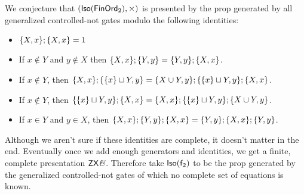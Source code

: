 \begin{conjecture}

We conjecture that $({\sf Iso}(\mathsf{FinOrd}_2),\times)$ is presented by the prop generated by all generalized controlled-not gates modulo the following identities:

\begin{itemize}
\item $\{ X,x\} ; \{ X,x \}= 1$ 


\item
If  $x \notin Y $ and $ y \notin X$ then $\{ X,x\} ;\{ Y,y\} =\{ Y,y\}; \{ X,x\} $.


%

\item
If $x \notin Y$, then $\{ X,x\}; \{ \{x\} \sqcup Y, y\} = \{ X\cup Y,y\} ; \{ \{x\} \sqcup Y, y\};  \{ X,x\} $.

\item
If $x \notin Y$, then $ \{ \{x\} \sqcup Y, y\} ; \{ X,x\} = \{ X,x\};   \{ \{x\} \sqcup Y, y\} ; \{ X\cup Y,y\} $.



\item
If $x \in Y$ and $y \in X$, then
$
\{  X,x \} ; \{  Y,y \} ;  \{  X,x \} 
=
\{  Y,y \} ;  \{  X,x \} ;  \{  Y,y \} 
$.



\end{itemize}


\end{conjecture}

Although we aren't sure if these identities are complete, it doesn't matter in the end.  Eventually once we add enough generators and identities, we get a finite, complete presentation $\mathsf{ZX}\textit{\&}$.  Therefore take ${\sf Iso}(\mathsf{f}_2)$ to be the prop generated by the generalized controlled-not gates of which no complete set of equations is known.  



